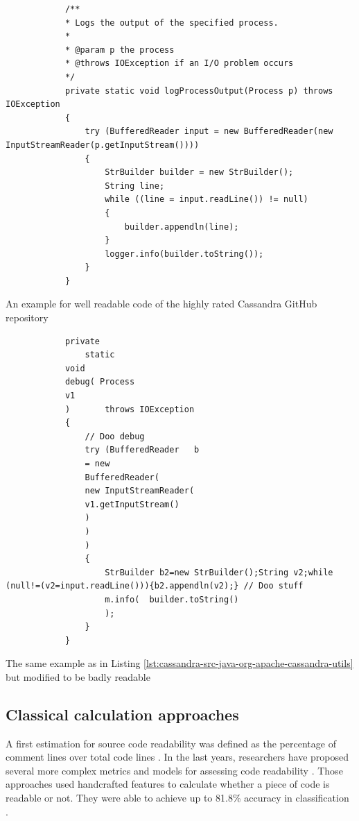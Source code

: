 \documentclass[%
class=scrreprt,
chapterprefix=false,%
open=right,%
twoside=false,%
paper=a4,%
logofile={Logo\_zentral\_farbig\_EN.png},%
thesistype=masterproposal,%
UKenglish,%
]{se2thesis}
\begin{document}
	\begin{listing}[!ht]
		\begin{verbatim}
			/**
			* Logs the output of the specified process.
			*
			* @param p the process
			* @throws IOException if an I/O problem occurs
			*/
			private static void logProcessOutput(Process p) throws IOException
			{
				try (BufferedReader input = new BufferedReader(new InputStreamReader(p.getInputStream())))
				{
					StrBuilder builder = new StrBuilder();
					String line;
					while ((line = input.readLine()) != null)
					{
						builder.appendln(line);
					}
					logger.info(builder.toString());
				}
			}
		\end{verbatim}
		\caption[An example for well readable code of the highly rated Cassandra GitHub repository]{An example for well readable code of the highly rated Cassandra GitHub repository}
		\label{lst:cassandra-src-java-org-apache-cassandra-utils}
	\end{listing}
	
	\begin{listing}[!ht]
		\begin{verbatim}
			private 
				static 
			void 
			debug( Process 
			v1 
			)       throws IOException
			{
				// Doo debug
				try (BufferedReader   b 
				= new 
				BufferedReader(
				new InputStreamReader(
				v1.getInputStream()
				)
				)
				)
				{
					StrBuilder b2=new StrBuilder();String v2;while (null!=(v2=input.readLine())){b2.appendln(v2);} // Doo stuff
					m.info(  builder.toString()
					);
				}
			}
		\end{verbatim}
		\caption{The same example as in Listing \ref{lst:cassandra-src-java-org-apache-cassandra-utils} but modified to be badly readable}
		\label{lst:cassandra-src-java-org-apache-cassandra-utils-modified}
	\end{listing}
	
%	
%	
%	
	
	\subsection{Classical calculation approaches} \label{Classical calculation approaches}
	A first estimation for source code readability was defined as the percentage of comment lines over total code lines \cite{aggarwal2002integrated}. In the last years, researchers have proposed several more complex metrics and models for assessing code readability \cite{buse2009learning, posnett2011simpler, dorn2012general, scalabrino2016improving}.
	Those approaches used handcrafted features to calculate whether a piece of code is readable or not. They were able to achieve up to 81.8\% accuracy in classification \cite{scalabrino2016improving}.
	
\end{document}
